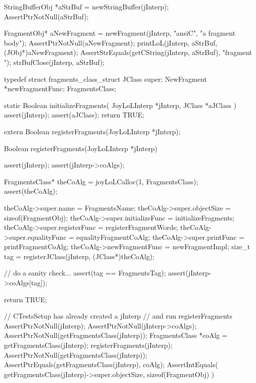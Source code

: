   StringBufferObj *aStrBuf = newStringBuffer(jInterp);
  AssertPtrNotNull(aStrBuf);
  
  FragmentObj* aNewFragment =
    newFragment(jInterp, "ansiC", "a fragment body");
  AssertPtrNotNull(aNewFragment);
  printLoL(jInterp, aStrBuf, (JObj*)aNewFragment);
  AssertStrEquals(getCString(jInterp, aStrBuf), "fragment ");
  strBufClose(jInterp, aStrBuf);
\stopCTest
\stopTestCase
\stopTestSuite

\startTestSuite[registerFragments]

\startCHeader
typedef struct fragments_class_struct {
  JClass       super;
  NewFragment      *newFragmentFunc;
} FragmentsClass;

\stopCHeader

\startCCode
static Boolean initializeFragments(
  JoyLoLInterp *jInterp,
  JClass   *aJClass
) {
  assert(jInterp);
  assert(aJClass);
  return TRUE;
}
\stopCCode

\startCHeader
extern Boolean registerFragments(JoyLoLInterp *jInterp);
\stopCHeader
{}

\startCCode
Boolean registerFragments(JoyLoLInterp *jInterp) {
  assert(jInterp);
  assert(jInterp->coAlgs);
  
  FragmentsClass* theCoAlg
    = joyLoLCalloc(1, FragmentsClass);
  assert(theCoAlg);
  
  theCoAlg->super.name           = FragmentsName;
  theCoAlg->super.objectSize     = sizeof(FragmentObj);
  theCoAlg->super.initializeFunc = initializeFragments;
  theCoAlg->super.registerFunc   = registerFragmentWords;
  theCoAlg->super.equalityFunc   = equalityFragmentCoAlg;
  theCoAlg->super.printFunc      = printFragmentCoAlg;
  theCoAlg->newFragmentFunc = newFragmentImpl;
  size_t tag =
    registerJClass(jInterp, (JClass*)theCoAlg);
  
  // do a sanity check...
  assert(tag == FragmentsTag);
  assert(jInterp->coAlgs[tag]);
   
  return TRUE;
}
\stopCCode


\startCTest
  // CTestsSetup has already created a jInterp
  // and run registerFragments
  AssertPtrNotNull(jInterp);
  AssertPtrNotNull(jInterp->coAlgs);
  AssertPtrNotNull(getFragmentsClass(jInterp));
  FragmentsClass *coAlg = getFragmentsClass(jInterp);
  registerFragments(jInterp);
  AssertPtrNotNull(getFragmentsClass(jInterp));
  AssertPtrEquals(getFragmentsClass(jInterp), coAlg);
  AssertIntEquals(
    getFragmentsClass(jInterp)->super.objectSize,
    sizeof(FragmentObj)
  )
\stopCTest
\stopTestCase
\stopTestSuite
